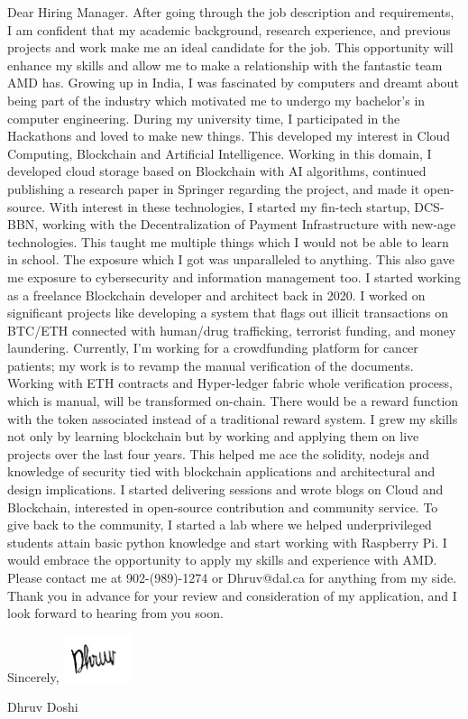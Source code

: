 \documentclass[letterpaper,11pt]{article}
\begin{document}
\bigbreak
Dear Hiring Manager. \newline
\newline
After going through the job description and requirements, I am confident that my academic background, research experience, and previous projects and work make me an ideal candidate for the job. This opportunity will enhance my skills and allow me to make a relationship with the fantastic team AMD has.
\bigbreak
Growing up in India, I was fascinated by computers and dreamt about being part of the industry which motivated me to undergo my bachelor’s in computer engineering. During my university time, I participated in the Hackathons and loved to make new things. This developed my interest in Cloud Computing, Blockchain and Artificial Intelligence. Working in this domain, I developed cloud storage based on Blockchain with AI algorithms, continued publishing a research paper in Springer regarding the project, and made it open-source.
\bigbreak
With interest in these technologies, I started my fin-tech startup, DCS-BBN, working with the Decentralization of Payment Infrastructure with new-age technologies. This taught me multiple things which I would not be able to learn in school. The exposure which I got was unparalleled to anything. This also gave me exposure to cybersecurity and information management too.
\bigbreak
I started working as a freelance Blockchain developer and architect back in 2020. I worked on significant projects like developing a system that flags out illicit transactions on BTC/ETH connected with human/drug trafficking, terrorist funding, and money laundering. Currently, I’m working for a crowdfunding platform for cancer patients; my work is to revamp the manual verification of the documents. Working with ETH contracts and Hyper-ledger fabric whole verification process, which is manual, will be transformed on-chain. There would be a reward function with the token associated instead of a traditional reward system. I grew my skills not only by learning blockchain but by working and applying them on live projects over the last four years. This helped me ace the solidity, nodejs and knowledge of security tied with blockchain applications and architectural and design implications.
\bigbreak
I started delivering sessions and wrote blogs on Cloud and Blockchain, interested in open-source contribution and community service. To give back to the community, I started a lab where we helped underprivileged students attain basic python knowledge and start working with Raspberry Pi.
\bigbreak
I would embrace the opportunity to apply my skills and experience with AMD. Please contact me at 902-(989)-1274 or Dhruv@dal.ca for anything from my side. Thank you in advance for your review and consideration of my application, and I look forward to hearing from you soon.
\bigbreak
\bigbreak

Sincerely,\newline
\includegraphics[height=2.5\baselineskip]{Signature.png} \par
Dhruv Doshi
\end{document}
